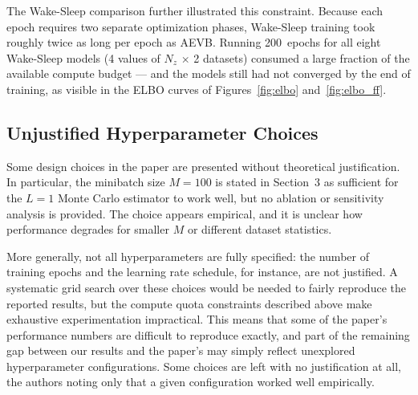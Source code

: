 \documentclass{article}
\begin{document}
The Wake-Sleep comparison further illustrated this constraint. Because each epoch
requires two separate optimization phases, Wake-Sleep training took roughly twice
as long per epoch as AEVB. Running 200~epochs for all eight Wake-Sleep models
(4 values of $N_z$ $\times$ 2 datasets) consumed a large fraction of the available
compute budget --- and the models still had not converged by the end of training,
as visible in the ELBO curves of Figures~\ref{fig:elbo} and~\ref{fig:elbo_ff}.

\subsection{Unjustified Hyperparameter Choices}
Some design choices in the paper are presented without theoretical justification.
In particular, the minibatch size $M = 100$ is stated in Section~3 as sufficient
for the $L = 1$ Monte Carlo estimator to work well, but no ablation or sensitivity
analysis is provided. The choice appears empirical, and it is unclear how
performance degrades for smaller $M$ or different dataset statistics.

More generally, not all hyperparameters are fully specified: the number of training
epochs and the learning rate schedule, for instance, are not justified. A systematic
grid search over these choices would be needed to fairly reproduce the reported
results, but the compute quota constraints described above make exhaustive
experimentation impractical. This means that some of the paper's performance numbers
are difficult to reproduce exactly, and part of the remaining gap between our results
and the paper's may simply reflect unexplored hyperparameter configurations. Some
choices are left with no justification at all, the authors noting only that a given
configuration worked well empirically.
\end{document}
